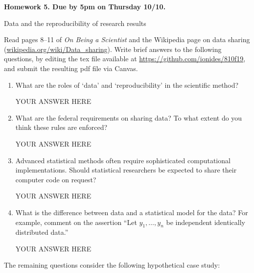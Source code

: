 \documentclass[12pt]{article}
\begin{document}
\begin{center}\bf
Homework 5. Due by 5pm on Thursday 10/10.

Data and the reproducibility of research results
\end{center}
Read pages 8--11 of {\em On Being a Scientist} and the Wikipedia page on data sharing (\url{wikipedia.org/wiki/Data_sharing}). Write brief answers to the following questions, by editing the tex file available at \url{https://github.com/ionides/810f19}, and submit the resulting pdf file via Canvas.

\begin{enumerate}

\item What are the roles of `data' and `reproducibility' in the scientific method? 

YOUR ANSWER HERE

\item What are the federal requirements on sharing data? To what extent do you think these rules are enforced?

YOUR ANSWER HERE

\item Advanced statistical methods often require sophisticated computational implementations. Should statistical researchers be expected to share their computer code on request?

YOUR ANSWER HERE

\item What is the difference between data and a statistical model for the data? For example, comment on the assertion ``Let $y_1,\dots,y_n$ be independent identically distributed data.''

YOUR ANSWER HERE
\end{enumerate}
The remaining questions consider the following hypothetical case study:
\end{document}
